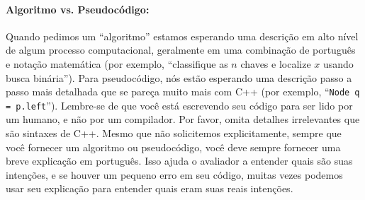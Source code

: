\documentclass{article}
\begin{document}
\paragraph{Algoritmo vs. Pseudocódigo:} Quando pedimos um “algoritmo” estamos esperando uma descrição em alto nível de algum processo computacional, geralmente em uma combinação de português e notação matemática (por exemplo, “classifique as $n$ chaves e localize $x$ usando busca binária”). Para pseudocódigo, nós estão esperando uma descrição passo a passo mais detalhada que se pareça muito mais com C++ (por exemplo, “\texttt{Node q = p.left}”). Lembre-se de que você está escrevendo seu código para ser lido por um humano, e não por um compilador. Por favor, omita detalhes irrelevantes que são sintaxes de C++. Mesmo que não solicitemos explicitamente, sempre que você fornecer um algoritmo ou pseudocódigo, você deve sempre fornecer uma breve explicação em português. Isso ajuda o avaliador a entender quais são suas intenções, e se houver um pequeno erro em seu código, muitas vezes podemos usar seu explicação para entender quais eram suas reais intenções.
\end{document}
